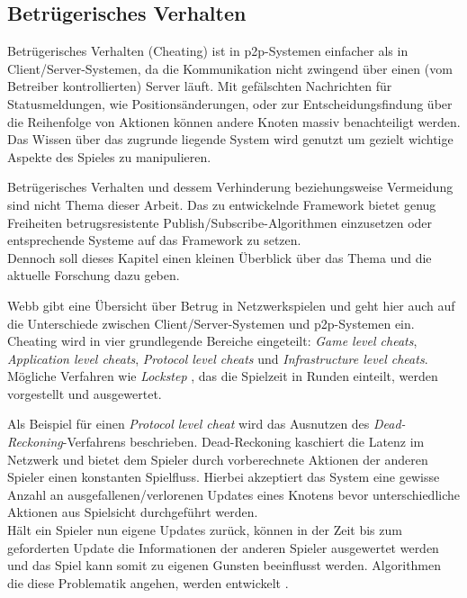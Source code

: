 \subsection{Betrügerisches Verhalten}
\label{chap:grundlagen:cheating}
Betrügerisches Verhalten (Cheating) ist in p2p-Systemen einfacher als in Client/Server-Systemen, da die Kommunikation nicht zwingend über einen (vom Betreiber kontrollierten) Server läuft. Mit gefälschten Nachrichten für Statusmeldungen, wie Positionsänderungen, oder zur Entscheidungsfindung über die Reihenfolge von Aktionen können andere Knoten massiv benachteiligt werden. Das Wissen über das zugrunde liegende System wird genutzt um gezielt wichtige Aspekte des Spieles zu manipulieren.

Betrügerisches Verhalten und dessem Verhinderung beziehungsweise Vermeidung sind nicht Thema dieser Arbeit. Das zu entwickelnde Framework bietet genug Freiheiten betrugsresistente Publish/Subscribe-Algorithmen einzusetzen oder entsprechende Systeme auf das Framework zu setzen.\\
Dennoch soll dieses Kapitel einen kleinen Überblick über das Thema und die aktuelle Forschung dazu geben.

Webb \cite{Webb2007Cheating} gibt eine Übersicht über Betrug in Netzwerkspielen und geht hier auch auf die Unterschiede zwischen Client/Server-Systemen und p2p-Systemen ein. Cheating wird in vier grundlegende Bereiche eingeteilt: \emph{Game level cheats}, \emph{Application level cheats}, \emph{Protocol level cheats} und \emph{Infrastructure level cheats}. Mögliche Verfahren wie \emph{Lockstep} \cite{Baughman2007}, das die Spielzeit in Runden einteilt, werden vorgestellt und ausgewertet.

Als Beispiel für einen \emph{Protocol level cheat} wird das Ausnutzen des \emph{Dead-Reckoning}-Verfahrens \cite{Pantel2002} beschrieben. Dead-Reckoning kaschiert die Latenz im Netzwerk und bietet dem Spieler durch vorberechnete Aktionen der anderen Spieler einen konstanten Spielfluss. Hierbei akzeptiert das System eine gewisse Anzahl an ausgefallenen/verlorenen Updates eines Knotens bevor unterschiedliche Aktionen aus Spielsicht durchgeführt werden.\\
Hält ein Spieler nun eigene Updates zurück, können in der Zeit bis zum geforderten Update die Informationen der anderen Spieler ausgewertet werden und das Spiel kann somit zu eigenen Gunsten beeinflusst werden. Algorithmen die diese Problematik angehen, werden entwickelt \cite{Aggarwal2005}.

